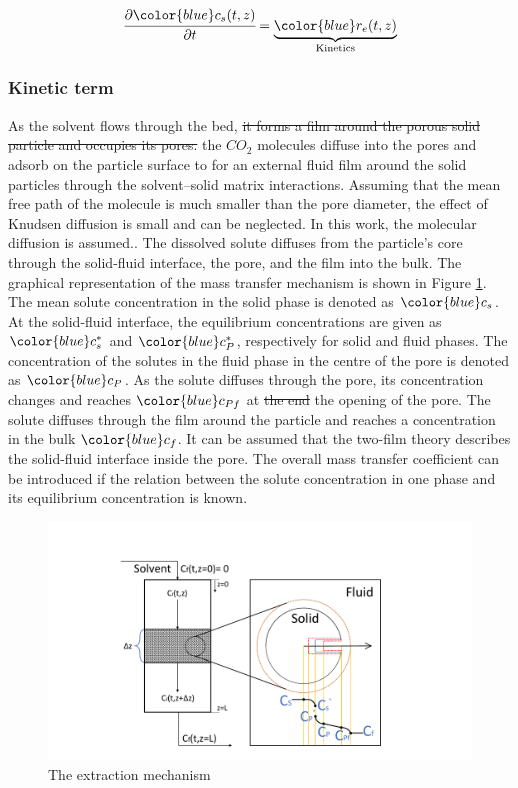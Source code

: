 \documentclass[a4paper,fleqn]{cas-dc}
\begin{document}
{\footnotesize
		\begin{equation} 
			\label{Model_solid}
			\cfrac{\partial {\color{blue}c_s}(t,z)}{\partial t} = \underbrace{ {\color{blue}r_e}(t,z) }_{\text{Kinetics}}
		\end{equation} }
	
\subsubsection{Kinetic term} \label{CH: Kinetic}
As the solvent flows through the bed, \sout{it forms a film around the porous solid particle and occupies its pores.} {\color{blue}the $CO_2$ molecules diffuse into the pores and adsorb on the particle surface to for an external fluid film around the solid particles through the solvent–solid matrix interactions. Assuming that the mean free path of the molecule is much smaller than the pore diameter, the effect of Knudsen diffusion is small and can be neglected. In this work, the molecular diffusion is assumed.}. The dissolved solute diffuses from the particle's core through the solid-fluid interface, the pore, and the film into the bulk. The graphical representation of the mass transfer mechanism is shown in Figure \ref{fig: SFE_Mechanism}. The mean solute concentration in the solid phase is denoted as ${\color{blue}c_s}$. At the solid-fluid interface, the equilibrium concentrations are given as ${\color{blue}c_s^*}$ and ${\color{blue}c_P^*}$, respectively for solid and fluid phases. The concentration of the solutes in the fluid phase in the centre of the pore is denoted as ${\color{blue}c_{P}}$. As the solute diffuses through the pore, its concentration changes and reaches ${\color{blue}c_{Pf}}$ at \sout{the end} {\color{blue}the opening} of the pore. The solute diffuses through the film around the particle and reaches a concentration in the bulk ${\color{blue}c_f}$. It can be assumed that the two-film theory describes the solid-fluid interface inside the pore. The overall mass transfer coefficient can be introduced if the relation between the solute concentration in one phase and its equilibrium concentration is known.

\begin{figure}[h!]
	\centering
	\includegraphics[trim = 5.8cm 1.1cm 6cm 0.8cm,clip,width=1.0\linewidth]{Figures/SFE_draft.pdf}	
	\caption{The extraction mechanism}
	\label{fig: SFE_Mechanism}
\end{figure}
\end{document}
